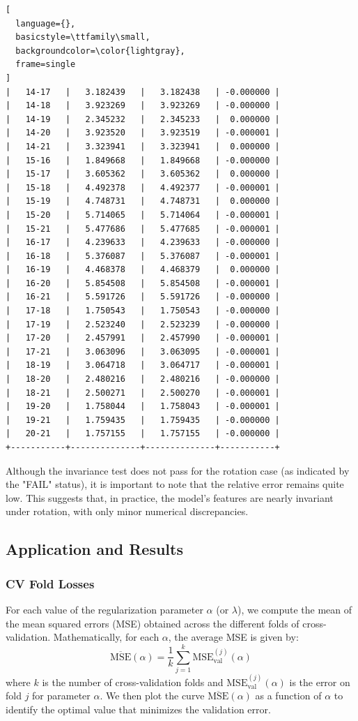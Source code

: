 \documentclass{article}
\begin{document}
\begin{lstlisting}[
  language={},
  basicstyle=\ttfamily\small,
  backgroundcolor=\color{lightgray},
  frame=single
]
|   14-17   |   3.182439   |   3.182438   | -0.000000 |
|   14-18   |   3.923269   |   3.923269   | -0.000000 |
|   14-19   |   2.345232   |   2.345233   |  0.000000 |
|   14-20   |   3.923520   |   3.923519   | -0.000001 |
|   14-21   |   3.323941   |   3.323941   |  0.000000 |
|   15-16   |   1.849668   |   1.849668   | -0.000000 |
|   15-17   |   3.605362   |   3.605362   |  0.000000 |
|   15-18   |   4.492378   |   4.492377   | -0.000001 |
|   15-19   |   4.748731   |   4.748731   |  0.000000 |
|   15-20   |   5.714065   |   5.714064   | -0.000001 |
|   15-21   |   5.477686   |   5.477685   | -0.000001 |
|   16-17   |   4.239633   |   4.239633   | -0.000000 |
|   16-18   |   5.376087   |   5.376087   | -0.000001 |
|   16-19   |   4.468378   |   4.468379   |  0.000000 |
|   16-20   |   5.854508   |   5.854508   | -0.000001 |
|   16-21   |   5.591726   |   5.591726   | -0.000000 |
|   17-18   |   1.750543   |   1.750543   | -0.000000 |
|   17-19   |   2.523240   |   2.523239   | -0.000000 |
|   17-20   |   2.457991   |   2.457990   | -0.000001 |
|   17-21   |   3.063096   |   3.063095   | -0.000001 |
|   18-19   |   3.064718   |   3.064717   | -0.000001 |
|   18-20   |   2.480216   |   2.480216   | -0.000000 |
|   18-21   |   2.500271   |   2.500270   | -0.000001 |
|   19-20   |   1.758044   |   1.758043   | -0.000001 |
|   19-21   |   1.759435   |   1.759435   | -0.000000 |
|   20-21   |   1.757155   |   1.757155   | -0.000000 |
+-----------+--------------+--------------+-----------+
\end{lstlisting}
Although the invariance test does not pass for the rotation case (as indicated by the "FAIL" status), it is important to note that the relative error remains quite low. This suggests that, in practice, the model's features are nearly invariant under rotation, with only minor numerical discrepancies.

\subsection{Application and Results}
\subsubsection{CV Fold Losses}

For each value of the regularization parameter \(\alpha\) (or \(\lambda\)), we compute the mean of the mean squared errors (MSE) obtained across the different folds of cross-validation. Mathematically, for each \(\alpha\), the average MSE is given by:
\[
\overline{\text{MSE}}(\alpha) = \frac{1}{k} \sum_{j=1}^k \text{MSE}_{\text{val}}^{(j)}(\alpha)
\]
where \(k\) is the number of cross-validation folds and \(\text{MSE}_{\text{val}}^{(j)}(\alpha)\) is the error on fold \(j\) for parameter \(\alpha\). We then plot the curve \(\overline{\text{MSE}}(\alpha)\) as a function of \(\alpha\) to identify the optimal value that minimizes the validation error.
\end{document}
